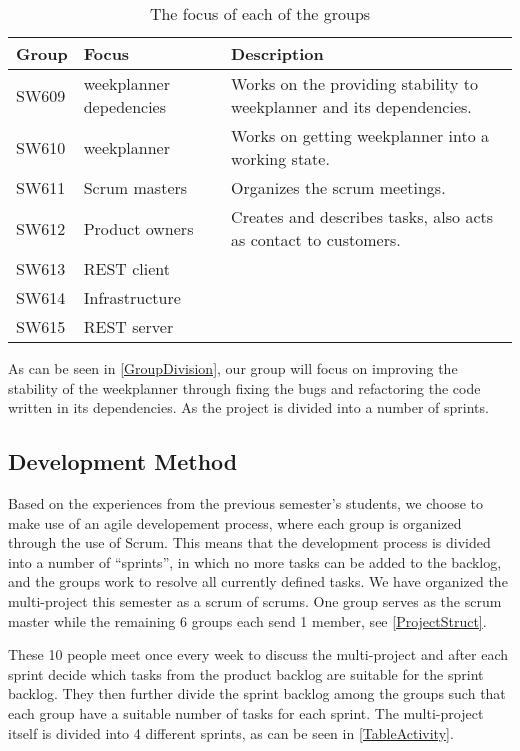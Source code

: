 \begin{table}[H]
\centering
\begin{tabular}{|p{2cm}|p{3cm}|p{8cm}|}
\hline
Group & Focus & Description \\ \hline
SW609 & weekplanner depedencies & Works on the providing stability to
weekplanner and its dependencies.\\\hline 
SW610 & weekplanner & Works on getting weekplanner into a working
state.\\\hline 
SW611 & Scrum masters & Organizes the scrum meetings. \\\hline 
SW612 & Product owners & Creates and describes tasks, also acts as contact to
customers. \\\hline 
SW613 & REST client & \\ \hline

SW614 & Infrastructure & \\ \hline

SW615 & REST server & \\ \hline

\end{tabular}
\caption{The focus of each of the groups}
\label{GroupDivision}
\end{table}

As can be seen in \autoref{GroupDivision}, our group will focus
on improving the stability of the weekplanner through fixing the
bugs and refactoring the code written in its dependencies. As the project
is divided into a number of sprints.

\subsection{Development Method}

Based on the experiences from the previous semester's students, we choose to
make use of an agile developement process, where each group is organized through
the use of Scrum. This means that the development process is divided into a
number of ``sprints'', in which no more tasks can be added to the backlog, and
the groups work to resolve all currently defined tasks. We have organized the
multi-project this semester as a scrum of scrums. One group serves as the scrum
master while the remaining 6 groups each send 1 member, see
\autoref{ProjectStruct}.


These 10 people meet once every week to discuss the multi-project and after each
sprint decide which tasks from the product backlog are suitable for the sprint
backlog. They then further divide the sprint backlog among the groups such that
each group have a suitable number of tasks for each sprint. The multi-project
itself is divided into 4 different sprints, as can be seen in
\autoref{TableActivity}. 

